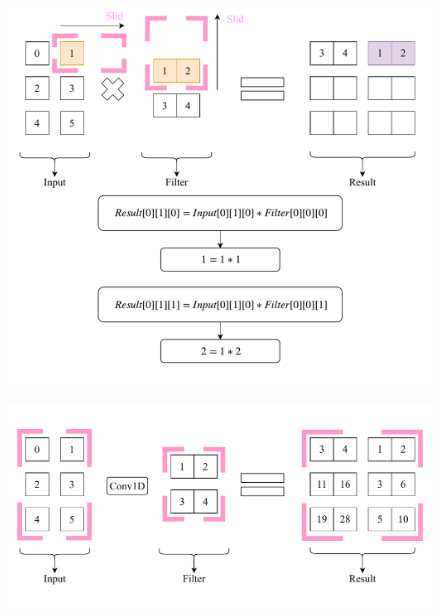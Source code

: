 \documentclass[12pt]{article}
\begin{document}
\begin{figure}[!htbp]
\begin{center}
	\includegraphics[width=\textwidth]{firstConvSample_step3}
\end{center}
\end{figure}
\begin{figure}[!htbp]
\begin{center}
	\includegraphics[width=\textwidth]{firstConvSample_final}
\end{center}
\end{figure}
\end{document}
